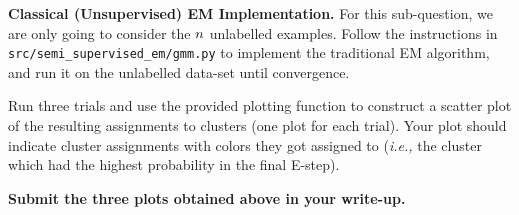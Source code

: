 \item{} \textbf{Classical (Unsupervised) EM Implementation.}
For this sub-question, we are only going to consider the ${n}$ unlabelled examples. Follow the instructions in \texttt{src/semi\_supervised\_em/gmm.py} to implement the traditional EM algorithm, and run it on the unlabelled data-set until convergence.

Run three trials and use the provided plotting function to construct a scatter plot of the resulting assignments to clusters (one plot for each trial). Your plot should indicate cluster assignments with colors they got assigned to (\emph{i.e.,} the cluster which had the highest probability in the final E-step).

\textbf{Submit the three plots obtained above in your write-up.}


